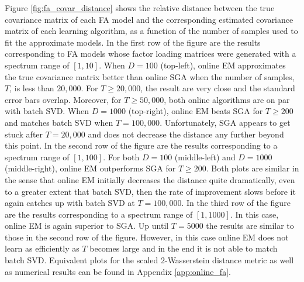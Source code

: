 \documentclass[msc,deptreport.inf]{infthesis} %
\begin{document}
Figure \ref{fig:fa_covar_distance} shows the relative distance between the true covariance matrix of each FA model and the corresponding estimated covariance matrix of each learning algorithm, as a function of the number of samples used to fit the approximate models. 
In the first row of the figure are the results corresponding to FA models whose factor loading matrices were generated with a spectrum range of $[1, 10]$. When $D=100$ (top-left), online EM approximates the true covariance matrix better than online SGA when the number of samples, $T$, is less than $20,000$. For $T \geq 20,000$, the result are very close and the standard error bars overlap. Moreover, for $T \geq 50,000$, both online algorithms are on par with batch SVD. When $D=1000$ (top-right), online EM beats SGA for $T \geq 200$ and matches batch SVD when $T=100,000$. Unfortunately, SGA appears to get stuck after $T=20,000$ and does not decrease the distance any further beyond this point. In the second row of the figure are the results corresponding to a spectrum range of $[1, 100]$. For both $D=100$ (middle-left) and $D=1000$ (middle-right), online EM outperforms SGA for $T \geq 200$. Both plots are similar in the sense that online EM initially decreases the distance quite dramatically, even to a greater extent that batch SVD, then the rate of improvement slows before it again catches up with batch SVD at $T=100,000$. In the third row of the figure are the results corresponding to a spectrum range of $[1, 1000]$. In this case, online EM is again superior to SGA. Up until $T=5000$ the results are similar to those in the second row of the figure. However, in this case online EM does not learn as efficiently as $T$ becomes large and in the end it is not able to match batch SVD. Equivalent plots for the scaled 2-Wasserstein distance metric as well as numerical results can be found in Appendix \ref{app:online_fa}.
\end{document}
